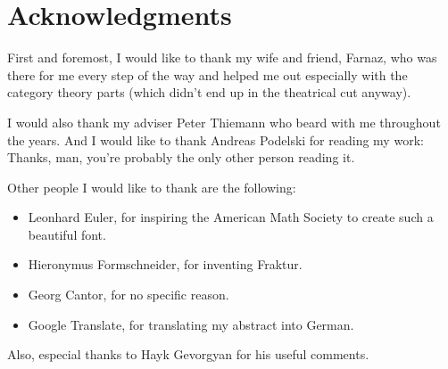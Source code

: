 \chapter{Acknowledgments}

First and foremost, I would like to thank my wife and friend, Farnaz, who was there for me every step of the way and helped me out especially with the category theory parts (which didn't end up in the theatrical cut anyway).

I would also thank my adviser Peter Thiemann who beard with me throughout the years. And I would like to thank Andreas Podelski for reading my work: Thanks, man, you're probably the only other person reading it.

Other people I would like to thank are the following:
\begin{itemize}
    \item Leonhard Euler, for inspiring the American Math Society to create such a beautiful font.
    \item Hieronymus Formschneider, for inventing Fraktur.
    \item Georg Cantor, for no specific reason.
    \item Google Translate, for translating my abstract into German.
\end{itemize}

Also, especial thanks to Hayk Gevorgyan for his useful comments.